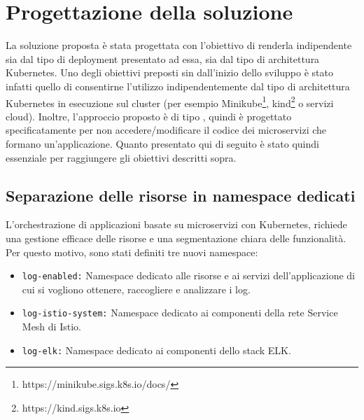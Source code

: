 \chapter{Progettazione della soluzione}\label{chap:Progettazione della soluzione}

La soluzione proposta è stata progettata con l'obiettivo di renderla indipendente sia dal tipo di deployment presentato ad essa, sia dal tipo di architettura Kubernetes. Uno degli obiettivi preposti sin dall'inizio dello sviluppo è stato infatti quello di consentirne l'utilizzo indipendentemente dal tipo di architettura Kubernetes in esecuzione sul cluster (per esempio Minikube\footnote{https://minikube.sigs.k8s.io/docs/}, kind\footnote{https://kind.sigs.k8s.io} o servizi cloud). Inoltre, l'approccio proposto è di tipo , quindi è progettato specificatamente per non accedere/modificare il codice dei microservizi che formano un'applicazione. Quanto presentato qui di seguito è stato quindi essenziale per raggiungere gli obiettivi descritti sopra.

\section{Separazione delle risorse in namespace dedicati}\label{sect:Spostamento delle risorse in namespace dedicati}
L'orchestrazione di applicazioni basate su microservizi con Kubernetes, richiede una gestione efficace delle risorse e una segmentazione chiara delle funzionalità. Per questo motivo, sono stati definiti tre nuovi namespace:
\begin{itemize}
\item \texttt{log-enabled:} Namespace dedicato alle risorse e ai servizi dell'applicazione di cui si vogliono ottenere, raccogliere e analizzare i log.
\item \texttt{log-istio-system:} Namespace dedicato ai componenti della rete Service Mesh di Istio.
\item \texttt{log-elk:} Namespace dedicato ai componenti dello stack ELK.
\end{itemize}



